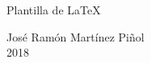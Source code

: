 \begin{titlepage}
\null
\pagestyle{plain}
\vspace{5cm}

\begin{center}
{\Huge  Plantilla de \LaTeX}
\end{center}

\vfill

\begin{flushright}
José Ramón Martínez Piñol\\
2018
\end{flushright}

\end{titlepage}
